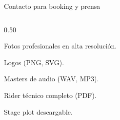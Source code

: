 \documentclass[11pt,notheorems,hyperref={pdfauthor={Séptima Ola}}]{beamer}
\let\olditemize\itemize
\let\oldenditemize\enditemize
\renewenvironment{itemize}
  {\vspace{-3pt}\olditemize\setlength{\itemsep}{1pt}\setlength{\parskip}{0pt}\setlength{\parsep}{0pt}}
  {\oldenditemize\vspace{-3pt}}
\begin{document}
{\begin{frame}[plain]{Contacto para booking y prensa}
\begin{columns}[T,totalwidth=\textwidth]
\begin{column}{0.50\textwidth}
    \begin{itemize}
      \item Fotos profesionales en alta resolución.
      \item Logos (PNG, SVG).
      \item Masters de audio (WAV, MP3).
      \item Rider técnico completo (PDF).
      \item Stage plot descargable.
    \end{itemize}
    \vspace{8pt}
  \end{column}
\end{columns}
\end{frame}}
\end{document}
